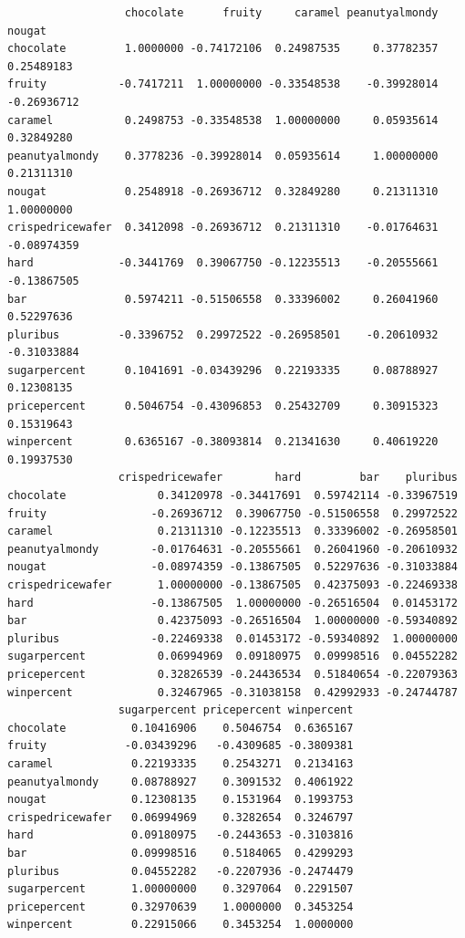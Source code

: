\documentclass[
  letterpaper,
  DIV=11,
  numbers=noendperiod]{scrartcl}
\begin{document}
\begin{verbatim}
                  chocolate      fruity     caramel peanutyalmondy      nougat
chocolate         1.0000000 -0.74172106  0.24987535     0.37782357  0.25489183
fruity           -0.7417211  1.00000000 -0.33548538    -0.39928014 -0.26936712
caramel           0.2498753 -0.33548538  1.00000000     0.05935614  0.32849280
peanutyalmondy    0.3778236 -0.39928014  0.05935614     1.00000000  0.21311310
nougat            0.2548918 -0.26936712  0.32849280     0.21311310  1.00000000
crispedricewafer  0.3412098 -0.26936712  0.21311310    -0.01764631 -0.08974359
hard             -0.3441769  0.39067750 -0.12235513    -0.20555661 -0.13867505
bar               0.5974211 -0.51506558  0.33396002     0.26041960  0.52297636
pluribus         -0.3396752  0.29972522 -0.26958501    -0.20610932 -0.31033884
sugarpercent      0.1041691 -0.03439296  0.22193335     0.08788927  0.12308135
pricepercent      0.5046754 -0.43096853  0.25432709     0.30915323  0.15319643
winpercent        0.6365167 -0.38093814  0.21341630     0.40619220  0.19937530
                 crispedricewafer        hard         bar    pluribus
chocolate              0.34120978 -0.34417691  0.59742114 -0.33967519
fruity                -0.26936712  0.39067750 -0.51506558  0.29972522
caramel                0.21311310 -0.12235513  0.33396002 -0.26958501
peanutyalmondy        -0.01764631 -0.20555661  0.26041960 -0.20610932
nougat                -0.08974359 -0.13867505  0.52297636 -0.31033884
crispedricewafer       1.00000000 -0.13867505  0.42375093 -0.22469338
hard                  -0.13867505  1.00000000 -0.26516504  0.01453172
bar                    0.42375093 -0.26516504  1.00000000 -0.59340892
pluribus              -0.22469338  0.01453172 -0.59340892  1.00000000
sugarpercent           0.06994969  0.09180975  0.09998516  0.04552282
pricepercent           0.32826539 -0.24436534  0.51840654 -0.22079363
winpercent             0.32467965 -0.31038158  0.42992933 -0.24744787
                 sugarpercent pricepercent winpercent
chocolate          0.10416906    0.5046754  0.6365167
fruity            -0.03439296   -0.4309685 -0.3809381
caramel            0.22193335    0.2543271  0.2134163
peanutyalmondy     0.08788927    0.3091532  0.4061922
nougat             0.12308135    0.1531964  0.1993753
crispedricewafer   0.06994969    0.3282654  0.3246797
hard               0.09180975   -0.2443653 -0.3103816
bar                0.09998516    0.5184065  0.4299293
pluribus           0.04552282   -0.2207936 -0.2474479
sugarpercent       1.00000000    0.3297064  0.2291507
pricepercent       0.32970639    1.0000000  0.3453254
winpercent         0.22915066    0.3453254  1.0000000
\end{verbatim}
\end{document}
